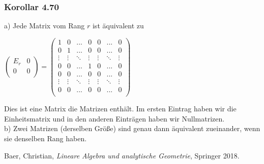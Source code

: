 \documentclass{article}
\begin{document}
\subsubsection*{Korollar 4.70}
a) Jede Matrix vom Rang $r$ ist äquivalent zu \\
\begin{center}
    $\begin{pmatrix}
        E_r & 0 \\
        0 & 0 \\
    \end{pmatrix} = \begin{pmatrix}
        1 & 0 & ... & 0 & 0 & ... & 0 \\
        0 & 1 & ... & 0 & 0 & ... & 0 \\
        \vdots & \vdots & \ddots & \vdots & \vdots & \ddots & \vdots \\
        0 & 0 & ... & 1 & 0 & ... & 0 \\
        0 & 0 & ... & 0 & 0 & ... & 0 \\
        \vdots & \vdots & \ddots & \vdots & \vdots & \ddots & \vdots \\
        0 & 0 & ... & 0 & 0 & ... & 0 \\
    \end{pmatrix}$ \\
\end{center}
Dies ist eine Matrix die Matrizen enthält. Im ersten Eintrag haben wir die Einheitsmatrix und in den anderen Einträgen haben wir Nullmatrizen. \\
b) Zwei Matrizen (derselben Größe) sind genau dann äquivalent zueinander, wenn sie denselben Rang haben. \\


\newpage
\begin{thebibliography}{9}
    Baer, Christian,
    \emph{Lineare Algebra und analytische Geometrie},
    Springer 2018.
    \end{thebibliography}
\end{document}
